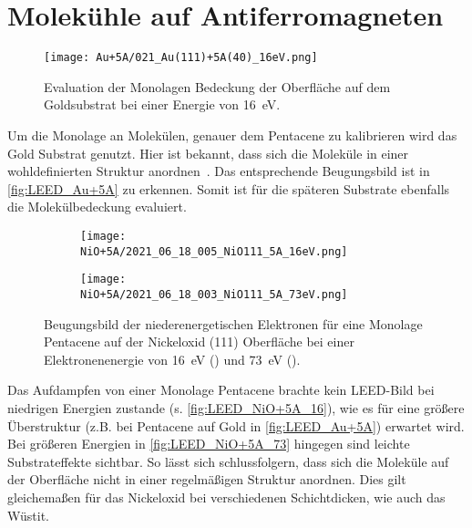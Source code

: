     \FloatBarrier
    \section{Molekühle auf Antiferromagneten} \label{sec:Ergeb}
        \begin{figure}
            \centering
            \texttt{[image: Au+5A/021\_Au(111)+5A(40)\_16eV.png]}
            \caption{Evaluation der Monolagen Bedeckung der Oberfläche auf dem Goldsubstrat bei einer Energie von \SI{16}{\electronvolt}.}
            \label{fig:LEED_Au+5A}
        \end{figure}
        Um die Monolage an Molekülen, genauer dem Pentacene zu kalibrieren wird das Gold Substrat genutzt.
        Hier ist bekannt, dass sich die Moleküle in einer wohldefinierten Struktur anordnen~\cite{5A_4}.
        Das entsprechende Beugungsbild ist in \autoref{fig:LEED_Au+5A} zu erkennen.
        Somit ist für die späteren Substrate ebenfalls die Molekülbedeckung evaluiert.

        \begin{figure}
            \centering
            \begin{subfigure}[t]{0.48\textwidth}
                \centering
                \texttt{[image: NiO+5A/2021\_06\_18\_005\_NiO111\_5A\_16eV.png]}
                \subcaption{}
                \label{fig:LEED_NiO+5A_16}
            \end{subfigure}
            \begin{subfigure}[t]{0.48\textwidth}
                \centering
                \texttt{[image: NiO+5A/2021\_06\_18\_003\_NiO111\_5A\_73eV.png]}
                \subcaption{}
                \label{fig:LEED_NiO+5A_73}
            \end{subfigure}
            \caption{Beugungsbild der niederenergetischen Elektronen für eine Monolage Pentacene auf der Nickeloxid (111) Oberfläche bei einer Elektronenenergie von \SI{16}{\electronvolt} () und \SI{73}{\electronvolt} ().}
            \label{fig:LEED_NiO+5A}
        \end{figure}
        Das Aufdampfen von einer Monolage Pentacene brachte kein LEED-Bild bei niedrigen Energien zustande (s. \autoref{fig:LEED_NiO+5A_16}), wie es für eine größere Überstruktur (z.B. bei Pentacene auf Gold in \autoref{fig:LEED_Au+5A}) erwartet wird.
        Bei größeren Energien in \autoref{fig:LEED_NiO+5A_73} hingegen sind leichte Substrateffekte sichtbar.
        So lässt sich schlussfolgern, dass sich die Moleküle auf der Oberfläche nicht in einer regelmäßigen Struktur anordnen.
        Dies gilt gleichemaßen für das Nickeloxid bei verschiedenen Schichtdicken, wie auch das Wüstit.

